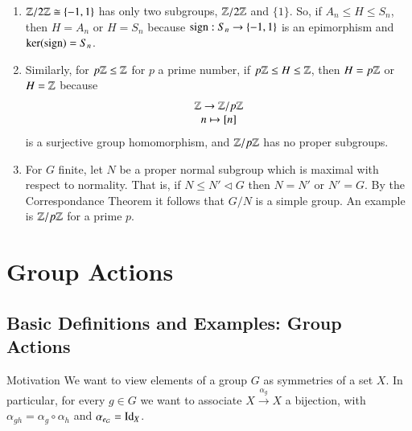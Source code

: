 \documentclass[12pt, a4paper, twoside, openright, titlepage]{book}
\begin{document}
\begin{eg}{}{}
        \leavevmode
        \begin{enumerate}
                \item $\mathbb Z/2\mathbb Z \cong \{-1,1\}$ has only two subgroups, $\mathbb Z/2\mathbb Z$ and $\{1\}$. So, if $A_n \leq H \leq S_n$, then $H = A_n$ or $H = S_n$ because $\operatorname{sign}:S_n\rightarrow \{-1,1\}$ is an epimorphism and $\ker(\operatorname{sign}) = S_n$.
                \item Similarly, for $p\mathbb Z\leq \mathbb Z$ for $p$ a prime number, if $p\mathbb Z \leq H \leq \mathbb Z$, then $H = p\mathbb Z$ or $H = \mathbb Z$ because \begin{equation}
                                \begin{array}{c} \mathbb Z\rightarrow \mathbb Z/p\mathbb Z \\ n\mapsto {[n]} \end{array}
                \end{equation}
                        is a surjective group homomorphism, and $\mathbb Z/p\mathbb Z$ has no proper subgroups.
                \item For $G$ finite, let $N$ be a proper normal subgroup which is maximal with respect to normality. That is, if $N \leq N' \vartriangleleft G$ then $N = N'$ or $N' = G$. By the Correspondance Theorem it follows that $G/N$ is a simple group. An example is $\mathbb Z/p\mathbb Z$ for a prime $p$.
        \end{enumerate}
\end{eg}




\chapter{\textsection\textsection Group Actions}

\section{\textsection Basic Definitions and Examples: Group Actions}

\begin{rmk}{Motivation}{}
        We want to view elements of a group $G$ as symmetries of a set $X$. In particular, for every $g \in G$ we want to associate $X \xrightarrow{\alpha_g} X$ a bijection, with $\alpha_{gh} = \alpha_g \circ \alpha_h$ and $\alpha_{e_G} = \operatorname{Id}_X$.
\end{rmk}
\end{document}
